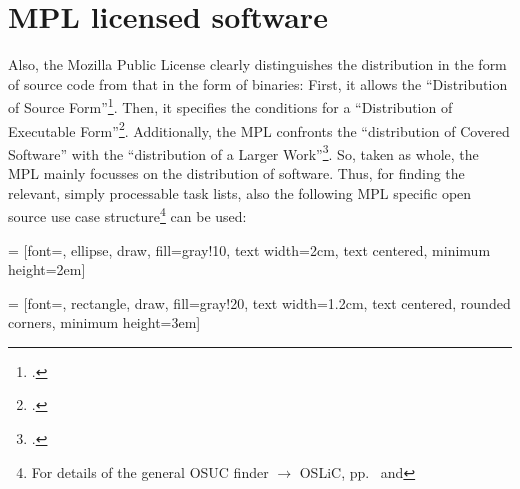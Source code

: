 %
%
%
%
%



\section{MPL licensed software}

Also, the Mozilla Public License clearly distinguishes the distribution in the
form of source code from that in the form of binaries: First, it allows the
\enquote{Distribution of Source Form}\footcite[cf.][\nopage wp\
§3.1]{Mpl20OsiLicense2013a}. Then, it specifies the conditions for a
\enquote{Distribution of Executable Form}\footcite[cf.][\nopage wp\
§3.2]{Mpl20OsiLicense2013a}. Additionally, the MPL confronts the
\enquote{distribution of Covered Software} with the \enquote{distribution of a
Larger Work}\footcite[cf.][\nopage wp\ §3.3]{Mpl20OsiLicense2013a}. So, taken
as whole, the MPL mainly focusses on the distribution of software. Thus, for
finding the relevant, simply processable task lists, also the following MPL
specific open source use case structure\footnote{For details of the general OSUC
finder $\rightarrow$ OSLiC, pp.\ \pageref{OsucTokens} and
\pageref{OsucDefinitionTree}} can be used:
 
 = [font=\small, ellipse, draw, fill=gray!10, 
    text width=2cm, text centered, minimum height=2em]

 = [font=\footnotesize, rectangle, draw, fill=gray!20, 
    text width=1.2cm, text centered, rounded corners, minimum height=3em]


